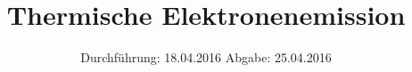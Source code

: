 
\subject{504}
\title{Thermische Elektronenemission}
\date{
  Durchführung: 18.04.2016
  \hspace{3em}
  Abgabe: 25.04.2016
}



\maketitle
\newpage
\mbox{}
\newpage
\thispagestyle{empty}
\tableofcontents
\newpage






\printbibliography


